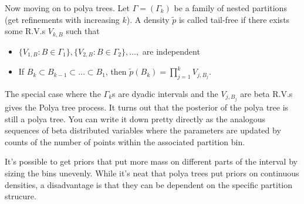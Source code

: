 \documentclass{article}
\begin{document}
Now moving on to polya trees. Let $\Gamma = \left(\Gamma_{k}\right)$ be a family
of nested partitions (get refinements with increasing $k$). A density
$\tilde{p}$ is called tail-free if there exists some R.V.s $V_{k, B}$ such that
 
\begin{itemize}
\item $\{V_{1, B}: B\in \Gamma_{1}\}, \{V_{2, B} : B \in \Gamma_{2}\}, \dots, $ are independent
\item If $B_{k} \subset B_{k - 1} \subset \dots \subset B_{1}$, then
  $\tilde{p}\left(B_{k}\right) = \prod_{j = 1}^{k} V_{j, B_{j}}$.
\end{itemize}

The special case where the $\Gamma_{k}$s are dyadic intervals and the
$V_{j, B_{j}}$ are beta R.V.s gives the Polya tree process. It turns out that
the posterior of the polya tree is still a polya tree. You can write it down
pretty directly as the analogous sequences of beta distributed variables where
the parameters are updated by counts of the number of points within the
associated partition bin.

It's possible to get priors that put more mass on different parts of the
interval by sizing the bins unevenly. While it's neat that polya trees put
priors on continuous densities, a disadvantage is that they can be dependent on
the specific partition strucure.
\end{document}
